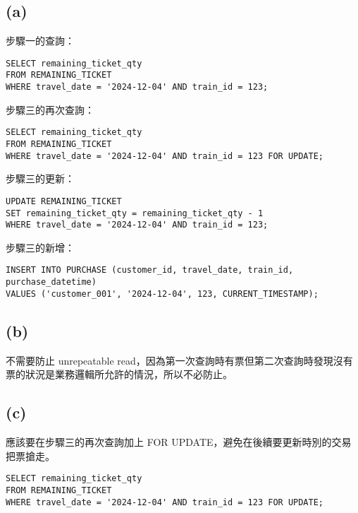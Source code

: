 \documentclass{article}
\begin{document}
\subsection*{(a)}
\noindent 步驟一的查詢：
\begin{verbatim}
SELECT remaining_ticket_qty 
FROM REMAINING_TICKET 
WHERE travel_date = '2024-12-04' AND train_id = 123;
\end{verbatim}
步驟三的再次查詢：
\begin{verbatim}
SELECT remaining_ticket_qty 
FROM REMAINING_TICKET 
WHERE travel_date = '2024-12-04' AND train_id = 123 FOR UPDATE;
\end{verbatim}
步驟三的更新：
\begin{verbatim}
UPDATE REMAINING_TICKET 
SET remaining_ticket_qty = remaining_ticket_qty - 1 
WHERE travel_date = '2024-12-04' AND train_id = 123;
\end{verbatim}
步驟三的新增：
\begin{verbatim}
INSERT INTO PURCHASE (customer_id, travel_date, train_id, purchase_datetime) 
VALUES ('customer_001', '2024-12-04', 123, CURRENT_TIMESTAMP);
\end{verbatim}

\subsection*{(b)}
不需要防止 unrepeatable read，因為第一次查詢時有票但第二次查詢時發現沒有票的狀況是業務邏輯所允許的情況，所以不必防止。

\subsection*{(c)}
應該要在步驟三的再次查詢加上 FOR UPDATE，避免在後續要更新時別的交易把票搶走。
\begin{verbatim}
SELECT remaining_ticket_qty 
FROM REMAINING_TICKET 
WHERE travel_date = '2024-12-04' AND train_id = 123 FOR UPDATE;
\end{verbatim}
\end{document}
